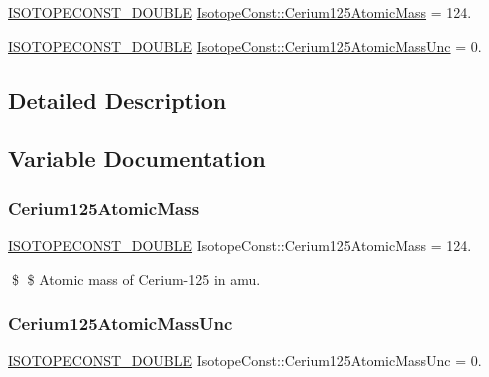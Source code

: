 \begin{DoxyCompactItemize}
\item 
\mbox{\hyperlink{group___isotope_const-_macros_ga8f45a7272ce02c0b4c65c44636ed719a}{I\+S\+O\+T\+O\+P\+E\+C\+O\+N\+S\+T\+\_\+\+D\+O\+U\+B\+LE}} \mbox{\hyperlink{group___isotope_const-_cerium-_ce125_ga1bdade923fbee00243d59d95a321aa7c}{Isotope\+Const\+::\+Cerium125\+Atomic\+Mass}} = 124.
\item 
\mbox{\hyperlink{group___isotope_const-_macros_ga8f45a7272ce02c0b4c65c44636ed719a}{I\+S\+O\+T\+O\+P\+E\+C\+O\+N\+S\+T\+\_\+\+D\+O\+U\+B\+LE}} \mbox{\hyperlink{group___isotope_const-_cerium-_ce125_gabbded7ed858179de558fdd7d3d5495cb}{Isotope\+Const\+::\+Cerium125\+Atomic\+Mass\+Unc}} = 0.
\end{DoxyCompactItemize}


\subsection{Detailed Description}


\subsection{Variable Documentation}
\mbox{\label{group___isotope_const-_cerium-_ce125_ga1bdade923fbee00243d59d95a321aa7c}} 
\subsubsection{\texorpdfstring{Cerium125\+Atomic\+Mass}{Cerium125AtomicMass}}
{\footnotesize\ttfamily \mbox{\hyperlink{group___isotope_const-_macros_ga8f45a7272ce02c0b4c65c44636ed719a}{I\+S\+O\+T\+O\+P\+E\+C\+O\+N\+S\+T\+\_\+\+D\+O\+U\+B\+LE}} Isotope\+Const\+::\+Cerium125\+Atomic\+Mass = 124.}

\$ \$ Atomic mass of Cerium-\/125 in amu. \mbox{\label{group___isotope_const-_cerium-_ce125_gabbded7ed858179de558fdd7d3d5495cb}} 
\subsubsection{\texorpdfstring{Cerium125\+Atomic\+Mass\+Unc}{Cerium125AtomicMassUnc}}
{\footnotesize\ttfamily \mbox{\hyperlink{group___isotope_const-_macros_ga8f45a7272ce02c0b4c65c44636ed719a}{I\+S\+O\+T\+O\+P\+E\+C\+O\+N\+S\+T\+\_\+\+D\+O\+U\+B\+LE}} Isotope\+Const\+::\+Cerium125\+Atomic\+Mass\+Unc = 0.}


